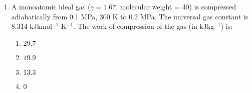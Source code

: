 \documentclass[journal,9pt,onecolumn]{IEEEtran}
\begin{document}
\begin{enumerate}
\item A monoatomic ideal gas ($\gamma = 1.67$, molecular weight = 40) is compressed adiabatically from 0.1 MPa, 300 K to 0.2 MPa. The universal gas constant is 8.314 kJkmol$^{-1}$ K$^{-1}$. The work of compression of the gas (in kJkg$^{-1}$) is:
\begin{multicols}{4}
\begin{enumerate}
    \item $29.7$
    \item $19.9$
    \item $13.3$
    \item $0$
\end{enumerate}
\end{multicols}
\end{enumerate}
\end{document}
